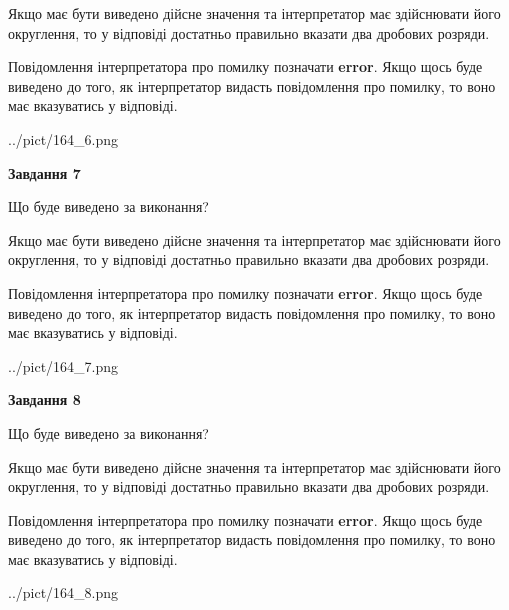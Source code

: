 \documentclass[12pt, ukrainian]{article}
\begin{document}
{\begin {Large}
Якщо має бути виведено дійсне значення та інтерпретатор має здійснювати його округлення, 
то у відповіді достатньо правильно вказати два дробових розряди.

Повідомлення інтерпретатора про помилку позначати \textbf{error}.
Якщо щось буде виведено до того, як інтерпретатор видасть повідомлення про помилку, 
то воно має вказуватись у відповіді. \par

\begin{center}
	{../pict/164_6.png}
\end{center}
\newpage

{\begin {center}\textbf{Завдання 7}\end {center}}\par
Що буде виведено за виконання? \par

Якщо має бути виведено дійсне значення та інтерпретатор має здійснювати його округлення, 
то у відповіді достатньо правильно вказати два дробових розряди.

Повідомлення інтерпретатора про помилку позначати \textbf{error}.
Якщо щось буде виведено до того, як інтерпретатор видасть повідомлення про помилку, 
то воно має вказуватись у відповіді. \par

\begin{center}
	{../pict/164_7.png}
\end{center}
\newpage

{\begin {center}\textbf{Завдання 8}\end {center}}\par
Що буде виведено за виконання? \par

Якщо має бути виведено дійсне значення та інтерпретатор має здійснювати його округлення, 
то у відповіді достатньо правильно вказати два дробових розряди.

Повідомлення інтерпретатора про помилку позначати \textbf{error}.
Якщо щось буде виведено до того, як інтерпретатор видасть повідомлення про помилку, 
то воно має вказуватись у відповіді. \par

\begin{center}
	{../pict/164_8.png}
\end{center}
\newpage


\end{Large}}
\end{document}
